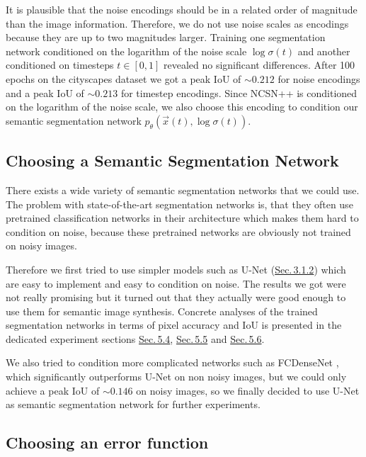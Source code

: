 It is plausible that the noise encodings should be in a related order of magnitude than the image information. Therefore, we do not use noise scales as encodings because they are up to two magnitudes larger. Training one segmentation network conditioned on the logarithm of the noise scale $\log \sigma(t)$ and another conditioned on timesteps $t\in[0,1]$ revealed no significant differences. After 100 epochs on the cityscapes dataset we got a peak IoU of $\sim0.212$ for noise encodings and a peak IoU of $\sim0.213$ for timestep encodings. Since NCSN++ is conditioned on the logarithm of the noise scale, we also choose this encoding to condition our semantic segmentation network $p_\theta(\vec{x}(t), \log \sigma(t))$.

\subsection{Choosing a Semantic Segmentation Network}

There exists a wide variety of semantic segmentation networks that we could use. The problem with state-of-the-art segmentation networks is, that they often use pretrained classification networks in their architecture which makes them hard to condition on noise, because these pretrained networks are obviously not trained on noisy images. 

Therefore we first tried to use simpler models such as U-Net (\hyperref[sec:3.1.2]{Sec.\,3.1.2}) which are easy to implement and easy to condition on noise. The results we got were not really promising but it turned out that they actually were good enough to use them for semantic image synthesis. Concrete analyses of the trained segmentation networks in terms of pixel accuracy and IoU is presented in the dedicated experiment sections \hyperref[sec:5.4]{Sec.\,5.4}, \hyperref[sec:5.5]{Sec.\,5.5} and \hyperref[sec:5.6]{Sec.\,5.6}.

We also tried to condition more complicated networks such as FCDenseNet \cite{densenet}, which significantly outperforms U-Net on non noisy images, but we could only achieve a peak IoU of $\sim0.146$ on noisy images, so we finally decided to use U-Net as semantic segmentation network for further experiments.

\subsection{Choosing an error function}

